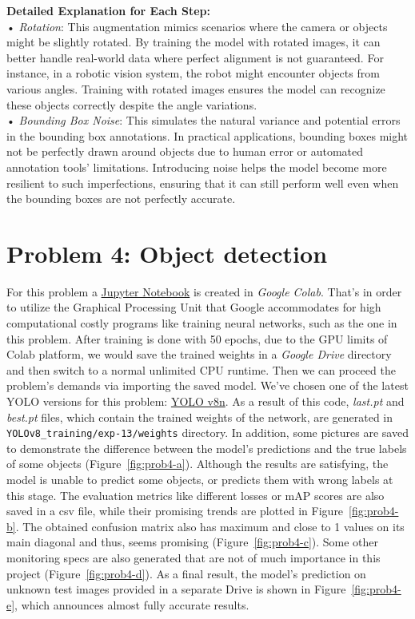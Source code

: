 \documentclass[conference]{IEEEtran}
\let\oldtexttt\texttt
\renewcommand{\texttt}[1]{\small\oldtexttt{#1}}
\begin{document}
\textbf{Detailed Explanation for Each Step:} \\
•	\textit{Rotation}: This augmentation mimics scenarios where the camera or objects might be slightly rotated. By training the model with rotated images, it can better handle real-world data where perfect alignment is not guaranteed. For instance, in a robotic vision system, the robot might encounter objects from various angles. Training with rotated images ensures the model can recognize these objects correctly despite the angle variations. \\
•	\textit{Bounding Box Noise}: This simulates the natural variance and potential errors in the bounding box annotations. In practical applications, bounding boxes might not be perfectly drawn around objects due to human error or automated annotation tools' limitations. Introducing noise helps the model become more resilient to such imperfections, ensuring that it can still perform well even when the bounding boxes are not perfectly accurate.
\vspace{10px}

\section{Problem 4: Object detection}
For this problem a \href{https://colab.research.google.com/drive/1RH5W2qrrn7r3mwXxXkabdknig7qeU1U5?usp=drive_link}{Jupyter Notebook} is created in \textit{Google Colab}. That's in order to utilize the Graphical Processing Unit that Google accommodates for high computational costly programs like training neural networks, such as the one in this problem. After training is done with 50 epochs, due to the GPU limits of Colab platform, we would save the trained weights in a \textit{Google Drive} directory and then switch to a normal unlimited CPU runtime. Then we can proceed the problem's demands via importing the saved model. We've chosen one of the latest YOLO versions for this problem: \underline{YOLO v8n}. As a result of this code, \textit{last.pt} and \textit{best.pt} files, which contain the trained weights of the network, are generated in \texttt{YOLOv8\_training/exp-13/weights} directory. In addition, some pictures are saved to demonstrate the difference between the model's predictions and the true labels of some objects (Figure~\ref{fig:prob4-a}). Although the results are satisfying, the model is unable to predict some objects, or predicts them with wrong labels at this stage. The evaluation metrics like different losses or mAP scores are also saved in a csv file, while their promising trends are plotted in Figure~\ref{fig:prob4-b}. The obtained confusion matrix also has maximum and close to 1 values on its main diagonal and thus, seems promising (Figure~\ref{fig:prob4-c}). Some other monitoring specs are also generated that are not of much importance in this project (Figure~\ref{fig:prob4-d}). As a final result, the model's prediction on unknown test images provided in a separate Drive is shown in Figure~\ref{fig:prob4-e}, which announces almost fully accurate results.
\end{document}
